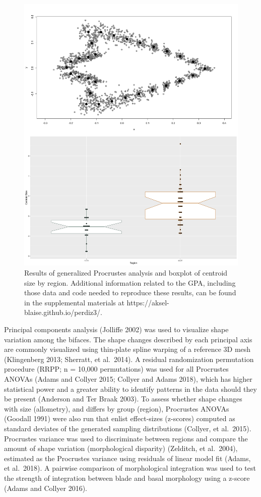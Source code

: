 \documentclass[smallextended]{svjour3}       %
\begin{document}
\begin{figure}
\includegraphics[width=1\linewidth]{ms-figs/figure3} \caption{Results of generalized Procrustes analysis and boxplot of centroid size by region. Additional information related to the GPA, including those data and code needed to reproduce these results, can be found in the supplemental materials at https://aksel-blaise.github.io/perdiz3/.}\label{fig:fig3}
\end{figure}

Principal components analysis (Jolliffe 2002) was used to visualize
shape variation among the bifaces. The shape changes described by each
principal axis are commonly visualized using thin-plate spline warping
of a reference 3D mesh (Klingenberg 2013; Sherratt, et al.~2014). A
residual randomization permutation procedure (RRPP; n = 10,000
permutations) was used for all Procrustes ANOVAs (Adams and Collyer
2015; Collyer and Adams 2018), which has higher statistical power and a
greater ability to identify patterns in the data should they be present
(Anderson and Ter Braak 2003). To assess whether shape changes with size
(allometry), and differs by group (region), Procrustes ANOVAs (Goodall
1991) were also run that enlist effect-sizes (z-scores) computed as
standard deviates of the generated sampling distributions (Collyer, et
al.~2015). Procrustes variance was used to discriminate between regions
and compare the amount of shape variation (morphological disparity)
(Zelditch, et al.~2004), estimated as the Procrustes variance using
residuals of linear model fit (Adams, et al.~2018). A pairwise
comparison of morphological integration was used to test the strength of
integration between blade and basal morphology using a z-score (Adams
and Collyer 2016).
\end{document}
